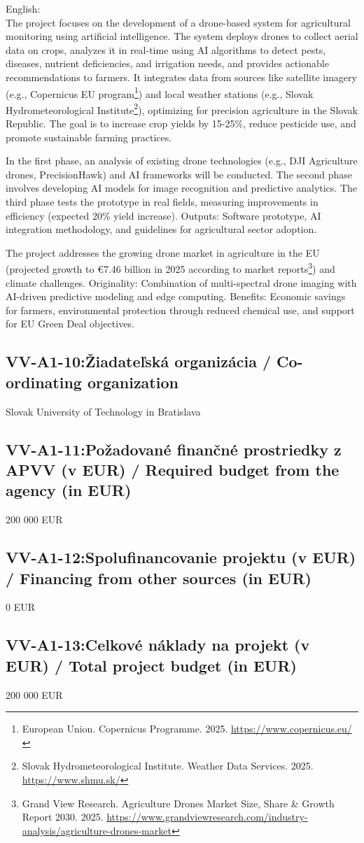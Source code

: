 English:\\The project focuses on the development of a drone-based system for agricultural monitoring using artificial intelligence. The system deploys drones to collect aerial data on crops, analyzes it in real-time using AI algorithms to detect pests, diseases, nutrient deficiencies, and irrigation needs, and provides actionable recommendations to farmers. It integrates data from sources like satellite imagery (e.g., Copernicus EU program\footnote{European Union. Copernicus Programme. 2025. \url{https://www.copernicus.eu/}}) and local weather stations (e.g., Slovak Hydrometeorological Institute\footnote{Slovak Hydrometeorological Institute. Weather Data Services. 2025. \url{https://www.shmu.sk/}}), optimizing for precision agriculture in the Slovak Republic. The goal is to increase crop yields by 15-25\%, reduce pesticide use, and promote sustainable farming practices.

In the first phase, an analysis of existing drone technologies (e.g., DJI Agriculture drones, PrecisionHawk) and AI frameworks will be conducted. The second phase involves developing AI models for image recognition and predictive analytics. The third phase tests the prototype in real fields, measuring improvements in efficiency (expected 20\% yield increase). Outputs: Software prototype, AI integration methodology, and guidelines for agricultural sector adoption.

The project addresses the growing drone market in agriculture in the EU (projected growth to €7.46 billion in 2025 according to market reports\footnote{Grand View Research. Agriculture Drones Market Size, Share \& Growth Report 2030. 2025. \url{https://www.grandviewresearch.com/industry-analysis/agriculture-drones-market}}) and climate challenges. Originality: Combination of multi-spectral drone imaging with AI-driven predictive modeling and edge computing. Benefits: Economic savings for farmers, environmental protection through reduced chemical use, and support for EU Green Deal objectives.
\subsection*{VV-A1-10:Žiadateľská organizácia / Co-ordinating organization }
Slovak University of Technology in Bratislava
\subsection*{VV-A1-11:Požadované finančné prostriedky z APVV (v EUR) / Required budget from the agency (in EUR) }
200 000 EUR
\subsection*{VV-A1-12:Spolufinancovanie projektu (v EUR) / Financing from other sources (in EUR)}
0 EUR
\subsection*{VV-A1-13:Celkové náklady na projekt (v EUR) / Total project budget (in EUR) }
200 000 EUR

